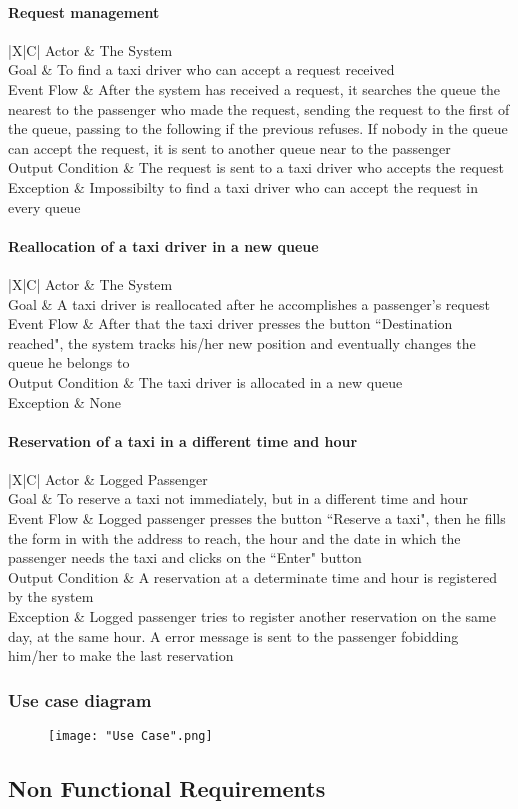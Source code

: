\documentclass[a4paper,12pt]{article}%
\newcommand{\usecasetable}[5]{
\begin{center}
\begin{tabularx}{\textwidth}{|X|C|}
\hline
Actor & #1\\
\hline
Goal & #2\\
\hline
Event Flow & #3\\
\hline
Output Condition & #4\\
\hline
Exception & #5\\
\hline
\end{tabularx}
\end{center}
}
\begin{document}
\paragraph{Request management}
\usecasetable {The System}{To find a taxi driver who can accept a request received}{After the system has received a request, it searches the queue the nearest to the passenger who made the request, sending the request to the first of the queue, passing to the following if the previous refuses. If nobody in the queue can accept the request, it is sent to another queue near to the passenger}{The request is sent to a taxi driver who accepts the request}{Impossibilty to find a taxi driver who can accept the request in every queue}
\paragraph{Reallocation of a taxi driver in a new queue}
\usecasetable {The System}{A taxi driver is reallocated after he accomplishes a passenger's request}{After that the taxi driver presses the button ``Destination reached", the system tracks his/her new position and eventually changes the queue he belongs to}{The taxi driver is allocated in a new queue}{None}
\paragraph{Reservation of a taxi in a different time and hour}
\usecasetable {Logged Passenger}{To reserve a taxi not immediately, but in a different time and hour}{Logged passenger presses the button ``Reserve a taxi", then he fills the form in with the address to reach, the hour and the date in which the passenger needs the taxi and clicks on the ``Enter" button}{A reservation at a determinate time and hour is registered by the system}{Logged passenger tries to register another reservation on the same day, at the same hour. A error message is sent to the passenger fobidding him/her to make the last reservation}

\subsubsection{Use case diagram}
\begin{figure}
\texttt{[image: "Use Case".png]}
\end{figure}

\pagebreak
\subsection{Non Functional Requirements}
\end{document}
